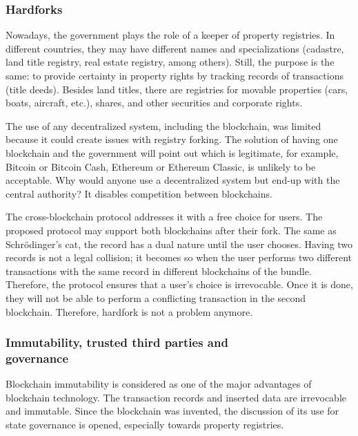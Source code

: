 \begin{multicols}{2}
\setcounter{secnumdepth}{5}
\renewcommand\thesubsubsection{\arabic{section}.\arabic{subsection}.\alph{subsubsection}}

\subsubsection{Hardforks}\label{subsubsec-5.2.a}

Nowadays, the government plays the role of a keeper of property registries. In different countries, they may have different names and specializations (cadastre, land title registry, real estate registry, among others). Still, the purpose is the same: to provide certainty in property rights by tracking records of transactions (title deeds). Besides land titles, there are registries for movable properties (cars, boats, aircraft, etc.), shares, and other securities and corporate rights.

The use of any decentralized system, including the blockchain, was limited because it could create issues with registry forking. The solution of having one blockchain and the government will point out which is legitimate, for example, Bitcoin or Bitcoin Cash, Ethereum or Ethereum Classic, is unlikely to be acceptable. Why would anyone use a decentralized system but end-up with the central authority? It disables competition between blockchains.

The cross-blockchain protocol addresses it with a free choice for users. The proposed protocol may support both blockchains after their fork. The same as Schrödinger’s cat, the record has a dual nature until the user chooses. Having two records is not a legal collision; it becomes so when the user performs two different transactions with the same record in different blockchains of the bundle. Therefore, the protocol ensures that a user’s choice is irrevocable. Once it is done, they will not be able to perform a conflicting transaction in the second blockchain. Therefore, hardfork is not a problem anymore.

\subsubsection{Immutability, trusted third parties and\\ governance}\label{subsubsec-5.2.b}

\vspace{-.2cm}

Blockchain immutability is considered as one of the major advantages of blockchain technology. The transaction records and inserted data are irrevocable and immutable. Since the blockchain was invented, the discussion of its use for state governance is opened, especially towards property registries.


\end{multicols}
